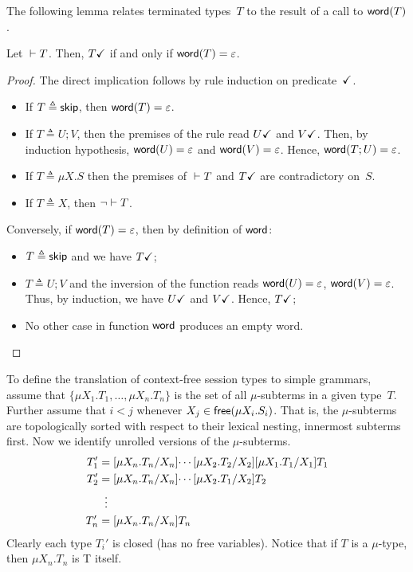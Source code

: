 The following lemma relates terminated types~$T$ to the result 
of a call to $\word(T)$. 

\begin{lemma}
  \label{lemma:terminated-togrammar}
  Let $\isType[] T$. Then, $\DONE T$ if and only if
  $\word(T) = \varepsilon$.
\end{lemma}
%
\begin{proof}
  The direct implication follows by rule induction on
  predicate~$\DONE$.
  \begin{itemize}
  \item If $T \triangleq \skipk$, then $\word(T) = \varepsilon$.
  \item If $T\triangleq U;V$, then the premises of the rule read
    $\DONE{U}$ and $\DONE{V}$. Then, by induction hypothesis,
    $\word(U) = \varepsilon$ and $\word(V) = \varepsilon$. Hence,
    $\word(T;U) = \varepsilon$.
  \item If $T\triangleq \mu X.S$ then the premises of $\isType[]T$ and
    $\DONE T$ are contradictory on~$S$.
  \item If $T\triangleq X$, then $\neg \isType[]T$.
  \end{itemize}
  Conversely, if $\word(T) = \varepsilon$, then by definition of
  $\word$:
  \begin{itemize}
  \item $T\triangleq \skipk$ and we have $\DONE T$;
  \item $T\triangleq U;V$ and the inversion of the function reads
    $\word(U) = \varepsilon$, $\word(V) = \varepsilon$.  Thus, by
    induction, we have $\DONE U$ and $\DONE V$. Hence, $\DONE T$;
  \item No other case in function $\word$ produces an empty word.
  \end{itemize}
\end{proof}



To define the translation of context-free session types to simple
grammars, assume that $\{\mu X_1.T_1,\dots,\mu X_n.T_n\}$ is the set
of all $\mu$-subterms in a given type~$T$. Further assume that $i<j$
whenever $X_j \in \free(\mu X_i.S_i)$. That is, the $\mu$-subterms are
topologically sorted with respect to their lexical nesting, innermost
subterms first.
%
Now we identify unrolled versions of the $\mu$-subterms.
%
\begin{align*}
  T_1' &= \subs{\mu X_n.T_n}{X_n}{ \cdots \subs{\mu X_2.T_2}{X_2}\subs{\mu X_1.T_1}{X_1}{T_1} }\\
  T_2' &= \subs{\mu X_n.T_n}{X_n}{ \cdots \subs{\mu X_2.T_1}{X_2}{T_2} }\\
       &\;\;\vdots \\
  T_n' &= \subs{\mu X_n.T_n}{X_n}{T_n} 
\end{align*}
%
Clearly each type $T_i'$ is closed (has no free variables).
Notice that if $T$ is a $\mu$-type, then $\mu X_n. T_n$ is T itself.

